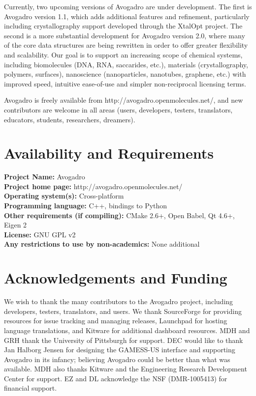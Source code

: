 \documentclass[10pt]{bmc_article}
\newenvironment{bmcformat}{\begin{raggedright}
\baselineskip20pt\sloppy\setboolean{publ}{false}}{\end{raggedright}
\baselineskip20pt\sloppy}
\begin{document}
\begin{bmcformat}
Currently, two upcoming versions of Avogadro are under development. The
first is Avogadro version 1.1, which adds additional features and
refinement, particularly including crystallography support developed
through the XtalOpt project. The second is a more substantial
development for Avogadro version 2.0, where many of the core data
structures are being rewritten in order to offer greater flexibility and
scalability. Our goal is to support an increasing scope of chemical
systems, including biomolecules (DNA, RNA, saccarides, etc.),
materials (crystallography, polymers, surfaces), nanoscience
(nanoparticles, nanotubes, graphene, etc.) with improved speed, intuitive
ease-of-use and simpler non-reciprocal licensing terms.

Avogadro is freely available from http://avogadro.openmolecules.net/,
and new contributors are welcome in all areas (users, developers,
testers, translators, educators, students, researchers, dreamers).

\section{Availability and Requirements}

\textbf{Project Name:} Avogadro \\
\textbf{Project home page:} http://avogadro.openmolecules.net/ \\
\textbf{Operating system(s):} Cross-platform \\
\textbf{Programming language:} C++, bindings to Python \\
\textbf{Other requirements (if compiling):} CMake 2.6+, Open Babel, Qt 4.6+,
Eigen 2 \\
\textbf{License:} GNU GPL v2 \\
\textbf{Any restrictions to use by non-academics:} None additional

\section{Acknowledgements and Funding}

We wish to thank the many contributors to the Avogadro project,
including developers, testers, translators, and users. We thank
SourceForge for providing resources for issue tracking and managing
releases, Launchpad for hosting language translations, and Kitware for
additional dashboard resources. MDH and GRH thank the University of
Pittsburgh for support. DEC would like to thank Jan Halborg Jensen for
designing the GAMESS-US interface and supporting Avogadro in its
infancy; believing Avogadro could be better than what was available.
MDH also thanks Kitware and the Engineering Research Development
Center for support. EZ and DL acknowledge the NSF (DMR-1005413) for
financial support.


\end{bmcformat}
\end{document}
